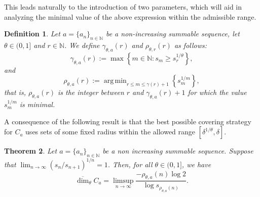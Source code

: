 \documentclass[11pt,reqno,bookmarksnumbered,raiselinks,breaklinks,colorlinks,plainpages]{amsart}
\DeclareMathOperator*{\argmin}{arg\,min}
\newtheorem{theo}{Theorem}[section]
\newtheorem{defi}[theo]{Definition}
\begin{document}
This leads naturally to the introduction of two parameters, which will aid in analyzing the minimal value of the above expression within the admissible range.
\begin{defi}\label{rho}
Let $a = \{a_n\}_{n \in \mathbb{N}}$ be a non-increasing summable sequence, let $\theta \in (0,1]$ and $r \in \mathbb{N}$. We define $\gamma_{\theta,a}(r)$ and $\rho_{\theta,r}(r)$ as follows:
\[
\gamma_{\theta,a}(r) := \max \left\{ m \in \mathbb{N} : s_m \geq s_r^{1/\theta} \right\},
\]
and
\[
\rho_{\theta,a}(r) := \argmin_{r \leq m \leq \gamma(r)+1} \left\{ s_m^{1/m} \right\},
\]
that is, $\rho_{\theta,a}(r)$ is the integer between $r$ and $\gamma_{\theta,a}(r)+1$ for which the value $s_m^{1/m}$ is minimal.
\end{defi}

A consequence of the following result is that the best possible covering strategy 
for $C_a$ uses sets of some fixed radius within the allowed range $[\delta^{1/\theta}, \delta]$.
\begin{theo}\label{dimension Cantor}
Let $a = \{a_n\}_{n \in \mathbb{N}}$ be a non increasing summable sequence. Suppose that \(\lim_{n\to\infty} (s_n/s_{n+1})^{1/n}=1\). Then, for all $\theta \in (0,1]$, we have
\begin{equation}\label{Th inciso 1} \overline{\dim}_\theta C_a=
    \limsup_{n \to \infty} \frac{-\rho_{\theta,a}(n) \log 2}{ \log s_{\rho_{\theta,a}(n)}}.
\end{equation}

\end{theo}
\end{document}
